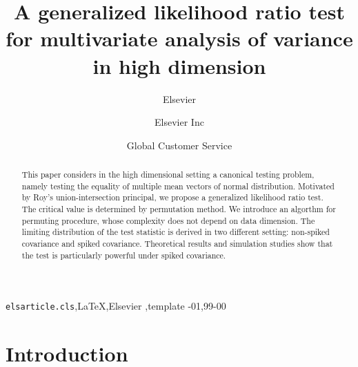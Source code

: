 \documentclass[review]{elsarticle}
\theoremstyle{plain}
\theoremstyle{definition}
\theoremstyle{remark}
\begin{document}
\begin{frontmatter}

\title{A generalized likelihood ratio test for multivariate analysis of variance in high dimension}

\author{Elsevier}
\address{Radarweg 29, Amsterdam}

\author[mymainaddress,mysecondaryaddress]{Elsevier Inc}

\author[mysecondaryaddress]{Global Customer Service}

\address[mymainaddress]{1600 John F Kennedy Boulevard, Philadelphia}
\address[mysecondaryaddress]{360 Park Avenue South, New York}

\begin{abstract}
    This paper considers in the high dimensional setting a canonical testing problem, namely testing the equality of multiple mean vectors of normal distribution.
    Motivated by Roy's union-intersection principal, we propose a generalized likelihood ratio test.
    The critical value is determined by permutation method.
    We introduce an algorthm for permuting procedure, whose complexity does not depend on data dimension.
    The limiting distribution of the test statistic is derived in two different setting: non-spiked covariance and spiked covariance.
    Theoretical results and simulation studies show that the test is particularly powerful under spiked covariance.
\end{abstract}

\begin{keyword}
\texttt{elsarticle.cls}\sep \LaTeX\sep Elsevier \sep template
-01\sep  99-00
\end{keyword}

\end{frontmatter}

\linenumbers
\section{Introduction}
\end{document}
